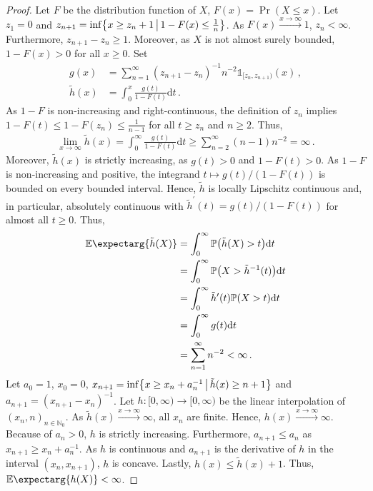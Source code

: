 \documentclass{scrartcl}
\newcommand{\PrOf}[1]{\Pr\mathopen{}\lb #1 \rb\mathclose{}}
\newcommand{\Prof}[1]{\Pr(#1)}
\newcommand{\Ex}{\E\expectarg}
\newcommand{\N}{\mathbb{N}}
\newcommand{\pr}{^\prime}
\newcommand{\dl}{\mathrm{d}}
\newcommand{\ind}{\mathds{1}}\newcommand{\indOf}[1]{\ind_{\!#1}}\newcommand{\indOfOf}[2]{\ind_{\!#1}\!\brOf{#2}}\newcommand{\indOfEvent}[1]{\indOf{\cbOf{#1}}}\newcommand{\indOfEventOf}[2]{\indOf{\cbOf{#1}}\!\brOf{#2}}\newcommand{\compl}{^\mathsf{c}}\DeclareMathOperator{\landauO}{\mathcal{O}}\newcommand{\landauOOf}[1]{\landauO\brOf{#1}}\DeclareMathOperator{\landauOmega}{\Omega}\newcommand{\landauOmegaOf}[1]{\landauOmega\brOf{#1}}\DeclareMathOperator{\landauTheta}{\Theta}\newcommand{\landauThetaOf}[1]{\landauTheta\brOf{#1}}\newcommand{\norm}{\left\Vert \cdot \right\Vert}
\newcommand{\equationFullstop}{\, .}
\newcommand{\eqfs}{\equationFullstop}
\newcommand{\equationComma}{\, ,}
\newcommand{\eqcm}{\equationComma}
\theoremstyle{plain}\newtheorem{theorem}{Theorem}[section]
\theoremstyle{definition}
\theoremstyle{remark}
\begin{document}
\begin{appendix}
\begin{proof}
	Let $F$ be the distribution function of $X$, $F(x) = \Prof{X \leq x}$.
	Let $z_1 = 0$ and $z_{n+1} = \inf \mathopen{}\left\lbrace x\geq z_n +1 \,\big\vert\, 1-F(x) \leq \frac1n \right\rbrace\mathclose{}$. As $F(x)\xrightarrow{x\to\infty} 1$, $z_n < \infty$. Furthermore, $z_{n+1}-z_n \geq 1$. Moreover, as $X$ is not almost surely bounded, $1-F(x) > 0$ for all $x\geq 0$. Set 
	\begin{align*}
		g(x) &= \sum_{n=1}^\infty (z_{n+1}-z_n)^{-1}n^{-2}\ind_{[z_n, z_{n+1})} (x)
		\eqcm
		\\
		\tilde h(x) &= \int_0^x \frac{g(t)}{1-F(t)} \dl t
		\eqfs
	\end{align*}
	As $1-F$ is non-increasing and right-continuous, the definition of $z_n$ implies $1-F(t) \leq 1-F(z_n) \leq \frac1{n-1}$ for all $t\geq z_n$ and $n\geq2$. Thus,
	\begin{align*}
		\lim_{x\to\infty} \tilde h(x)
		=
		\int_0^\infty \frac{g(t)}{1-F(t)} \dl t
		\geq
		\sum_{n=2}^\infty (n-1) n^{-2}
		=
		\infty
		\eqfs
	\end{align*}
	Moreover, $\tilde h(x)$ is strictly increasing, as $g(t) > 0$ and $1-F(t) > 0$.
	As $1-F$ is non-increasing and positive, the integrand $t \mapsto g(t)/(1-F(t))$ is bounded on every bounded interval. Hence, $\tilde h$ is locally Lipschitz continuous and, in particular, absolutely continuous with $\tilde h\pr(t) = g(t)/(1-F(t))$ for almost all $t\geq0$. Thus,
	\begin{align*}
		\Ex{\tilde h(X)}
		&=
		\int_0^\infty \PrOf{\tilde h(X) > t} \dl t
		\\&=
		\int_0^\infty \PrOf{X > \tilde h^{-1}(t)} \dl t
		\\&=
		\int_0^\infty \tilde h\pr(t) \PrOf{X > t} \dl t
		\\&=
		\int_0^\infty g(t) \dl t
		\\&=
		\sum_{n=1}^\infty n^{-2}
		<
		\infty
		\eqfs
	\end{align*}
	Let $a_0 = 1$, $x_0=0$, $x_{n+1} = \inf\mathopen{}\left\lbrace x \geq x_n + a_n^{-1} \,\big\vert\, \tilde h(x) \geq n+1 \right\rbrace\mathclose{}$ and $a_{n+1} = (x_{n+1} - x_n)^{-1}$. Let $h \colon [0,\infty) \to [0,\infty)$ be the linear interpolation of $(x_n, n)_{n\in\N_0}$. 
	As $\tilde h(x) \xrightarrow{x\to\infty}\infty$, all $x_n$ are finite. Hence, $h(x) \xrightarrow{x\to\infty}\infty$. 
	Because of $a_n > 0$, $h$ is strictly increasing.
	Furthermore, $a_{n+1} \leq a_n$ as $x_{n+1} \geq x_n + a_n^{-1}$. As $h$ is continuous and $a_{n+1}$ is the derivative of $h$ in the interval $(x_n, x_{n+1})$, $h$ is concave.
	Lastly, $h(x) \leq \tilde h(x) + 1$. Thus, $\Ex{h(X)} < \infty$.

\end{proof}
\end{appendix}
\end{document}
